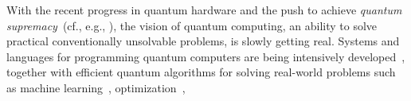 

With the recent progress in quantum hardware and the push to achieve \emph{quantum
supremacy}~(cf., e.g., \cite{AruteABBBBB2019}), the vision of quantum computing, an ability
to solve practical conventionally unsolvable problems, is slowly getting real. 
Systems and languages for programming quantum computers are being intensively
developed~\cite{WilleMN19,AltenkirchG05,GreenLRSV13}, together with efficient quantum
algorithms for solving real-world problems such as machine
learning~\cite{BiamonteWPRWL17,CilibertoHIPRSW18}, optimization~\cite{Moll18},



